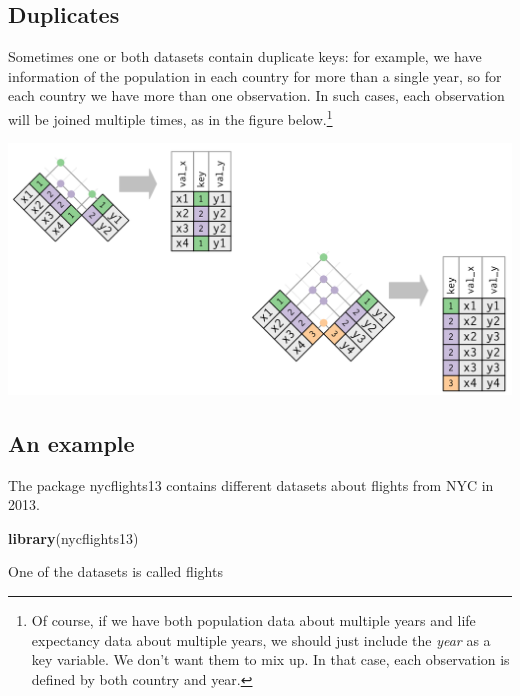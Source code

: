\documentclass[]{tufte-book}
\newenvironment{Shaded}{}{}
\newcommand{\KeywordTok}[1]{\textcolor[rgb]{0.00,0.44,0.13}{\textbf{#1}}}
\newcommand{\NormalTok}[1]{#1}
\newcommand{\OperatorTok}[1]{\textcolor[rgb]{0.40,0.40,0.40}{#1}}
\newcommand{\StringTok}[1]{\textcolor[rgb]{0.25,0.44,0.63}{#1}}
\begin{document}
\hypertarget{duplicates}{%
\subsection{Duplicates}\label{duplicates}}

Sometimes one or both datasets contain duplicate keys: for example, we have information of the population in each country for more than a single year, so for each country we have more than one observation. In such cases, each observation will be joined multiple times, as in the figure below.\footnote{Of course, if we have both population data about multiple years and life expectancy data about multiple years, we should just include the \emph{year} as a key variable. We don't want them to mix up. In that case, each observation is defined by both country and year.}

\includegraphics[width=1\linewidth]{images/join_duplicates}

\hypertarget{an-example}{%
\subsection{An example}\label{an-example}}

The package nycflights13 contains different datasets about flights from NYC in 2013.

\begin{Shaded}
\begin{Highlighting}[]
\KeywordTok{library}\NormalTok{(nycflights13)}
\end{Highlighting}
\end{Shaded}

One of the datasets is called flights

\begin{Shaded}
\end{Shaded}
\end{document}
